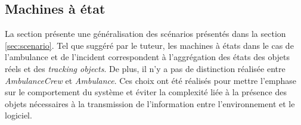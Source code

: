 \subsection{Machines à état}
\label{sec:MachineAEtat}

	La section présente une généralisation des scénarios présentés dans la
	section \ref{sec:scenario}.   Tel que suggéré par le tuteur,  les machines
	à états dans le cas de l'ambulance et de l'incident correspondent à
	l'aggrégation des états des objets réels et des \textit{tracking objects}.
	De plus, il n'y a pas de distinction réalisée entre \textit{AmbulanceCrew}
	et \textit{Ambulance}.  Ces choix ont été réalisés pour mettre l'emphase
	sur le comportement du système et éviter la complexité liée à la présence
	des objets nécessaires à la transmission de l'information entre
	l'environnement et le logiciel.
 	

